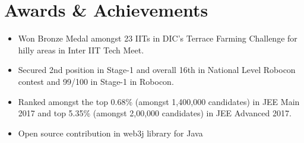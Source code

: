 \documentclass[a4paper,10pt]{article}
\newcommand{\customHeading}[1]{
    \section{\texorpdfstring{#1 \hrulefill}{}}
}
\begin{document}
\customHeading{Awards \& Achievements}
\begin{minipage}[t]{\linewidth}
    \begin{itemize}[nosep,after=\strut, leftmargin=1em, itemsep=3pt]
        \item Won Bronze Medal amongst 23 IITs in DIC’s Terrace Farming Challenge for hilly areas in Inter IIT Tech Meet.
        \item Secured 2nd position in Stage-1 and overall 16th in National Level Robocon contest and 99/100 in Stage-1 in Robocon.
        \item  Ranked amongst the top 0.68\% (amongst 1,400,000 candidates) in JEE Main 2017 and top 5.35\% (amongst 2,00,000 candidates) in JEE Advanced 2017.
        \item  Open source contribution in web3j library for Java
    \end{itemize}
\end{minipage}





\vfill
\end{document}

